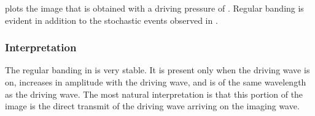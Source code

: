 






  plots the image that is obtained with a driving pressure of \dbFifteen.
Regular banding is evident in addition to the stochastic events observed in .

\subsubsection{Interpretation}

The regular banding in  is very stable.
It is present only when the driving wave is on, increases in amplitude with the driving wave,
and is of the same wavelength as the driving wave.
The most natural interpretation is that this portion of the image is the 
direct transmit of the driving wave arriving on the imaging wave.

